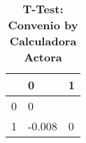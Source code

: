 \begin{table}[H]\centering \caption{\textbf{T-Test: Convenio by Calculadora Actora}}
\begin{tabular}{l*{2}{l}}
\toprule
                     & 0            & 1\\\midrule
0             &      0                   \\
1             & -0.008       &      0    \\
\bottomrule\end{tabular}
\end{table}
